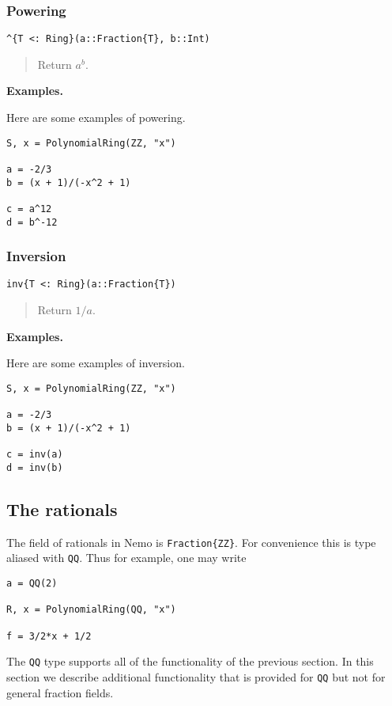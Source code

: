 \documentclass[a4paper,10pt]{article}
\newcommand{\code}{\lstinline}
\newcommand{\desc}[1]{\vspace{-3mm}\begin{quote}#1\end{quote}}
\begin{document}
{{{\subsubsection{Powering}

\begin{lstlisting}
^{T <: Ring}(a::Fraction{T}, b::Int)
\end{lstlisting}

\desc{Return $a^b$.}

\textbf{Examples.}

Here are some examples of powering.

\begin{lstlisting}
S, x = PolynomialRing(ZZ, "x")

a = -2/3
b = (x + 1)/(-x^2 + 1)

c = a^12
d = b^-12
\end{lstlisting}

\subsubsection{Inversion}

\begin{lstlisting}
inv{T <: Ring}(a::Fraction{T})
\end{lstlisting}

\desc{Return $1/a$.}

\textbf{Examples.}

Here are some examples of inversion.

\begin{lstlisting}
S, x = PolynomialRing(ZZ, "x")

a = -2/3
b = (x + 1)/(-x^2 + 1)

c = inv(a)
d = inv(b)
\end{lstlisting}

\subsection{The rationals}

The field of rationals in Nemo is \code|Fraction{ZZ}|. For convenience this is
type aliased with \code{QQ}. Thus for example, one may write

\begin{lstlisting}
a = QQ(2)

R, x = PolynomialRing(QQ, "x")

f = 3/2*x + 1/2
\end{lstlisting}

The \code{QQ} type supports all of the functionality of the previous section. In
this section we describe additional functionality that is provided for \code{QQ}
but not for general fraction fields.

}}}
\end{document}
